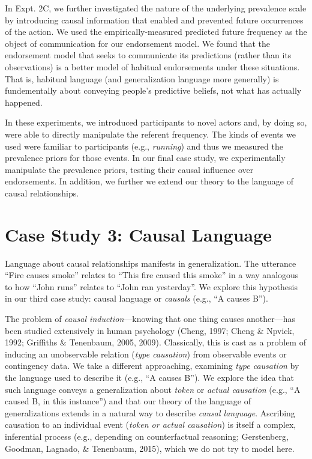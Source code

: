 \documentclass[english,,man,floatsintext]{apa6}
\theoremstyle{definition}
\theoremstyle{definition}
\theoremstyle{definition}
\theoremstyle{remark}
\begin{document}
In Expt. 2C, we further investigated the nature of the underlying
prevalence scale by introducing causal information that enabled and
prevented future occurrences of the action. We used the
empirically-measured predicted future frequency as the object of
communication for our endorsement model. We found that the endorsement
model that seeks to communicate its predictions (rather than its
observations) is a better model of habitual endorsements under these
situations. That is, habitual language (and generalization language more
generally) is fundementally about conveying people's predictive beliefs,
not what has actually happened.

In these experiments, we introduced participants to novel actors and, by
doing so, were able to directly manipulate the referent frequency. The
kinds of events we used were familiar to participants (e.g.,
\emph{running}) and thus we measured the prevalence priors for those
events. In our final case study, we experimentally manipulate the
prevalence priors, testing their causal influence over endorsements. In
addition, we further we extend our theory to the language of causal
relationships.

\hypertarget{case-study-3-causal-language}{%
\section{Case Study 3: Causal
Language}\label{case-study-3-causal-language}}

Language about causal relationships manifests in generalization. The
utterance \enquote{Fire causes smoke} relates to \enquote{This fire
caused this smoke} in a way analogous to how \enquote{John runs} relates
to \enquote{John ran yesterday}. We explore this hypothesis in our third
case study: causal language or \emph{causals} (e.g., \enquote{A causes
B}).

The problem of \emph{causal induction}---knowing that one thing causes
another---has been studied extensively in human psychology (Cheng, 1997;
Cheng \& Npvick, 1992; Griffiths \& Tenenbaum, 2005, 2009). Classically,
this is cast as a problem of inducing an unobservable relation
(\emph{type causation}) from observable events or contingency data. We
take a different approaching, examining \emph{type causation} by the
language used to describe it (e.g., \enquote{A causes B}). We explore
the idea that such language conveys a generalization about \emph{token}
or \emph{actual causation} (e.g., \enquote{A caused B, in this
instance}) and that our theory of the language of generalizations
extends in a natural way to describe \emph{causal language}. Ascribing
causation to an individual event (\emph{token or actual causation}) is
itself a complex, inferential process (e.g., depending on counterfactual
reasoning; Gerstenberg, Goodman, Lagnado, \& Tenenbaum, 2015), which we
do not try to model here.
\end{document}
